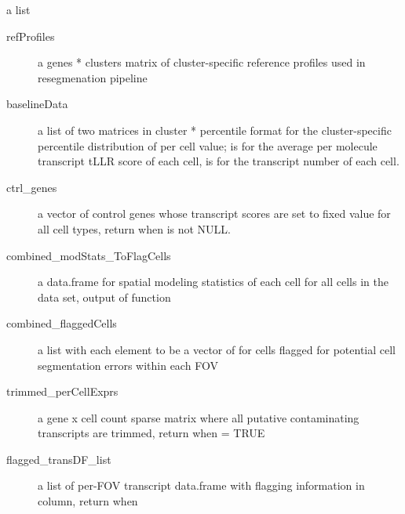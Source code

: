 \documentclass[letterpaper]{book}
\begin{document}
%
\begin{Value}
a list
\begin{description}

\item[refProfiles] a genes * clusters matrix of cluster-specific reference profiles used in resegmenation pipeline
\item[baselineData] a list of two matrices in cluster * percentile format for the cluster-specific percentile distribution of per cell value;  is for the average per molecule transcript tLLR score of each cell,  is for the transcript number of each cell.
\item[ctrl\_genes] a vector of control genes whose transcript scores are set to fixed value for all cell types, return when  is not NULL.
\item[combined\_modStats\_ToFlagCells] a data.frame for spatial modeling statistics of each cell for all cells in the data set, output of  function
\item[combined\_flaggedCells] a list with each element to be a vector of  for cells flagged for potential cell segmentation errors within each FOV
\item[trimmed\_perCellExprs] a gene x cell count sparse matrix where all putative contaminating transcripts are trimmed, return when  = TRUE
\item[flagged\_transDF\_list] a list of per-FOV transcript data.frame with flagging information in  column, return when 

\end{description}

\end{Value}
%
\end{document}
